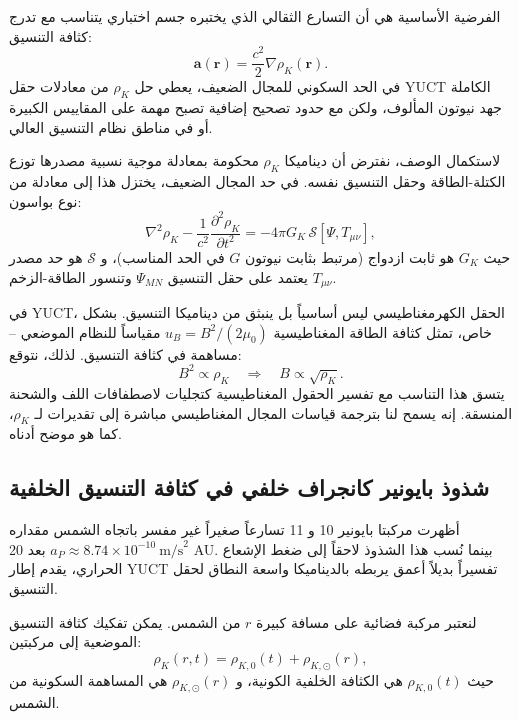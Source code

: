 \documentclass[11pt,a4paper]{article}
\theoremstyle{remark}
\begin{document}
	الفرضية الأساسية هي أن التسارع الثقالي الذي يختبره جسم اختباري يتناسب مع تدرج كثافة التنسيق:
	\begin{equation}
		\mathbf{a}(\mathbf{r}) = \frac{c^2}{2} \nabla \rho_K(\mathbf{r}).
		\label{eq:coord:grav_from_rho}
	\end{equation}
	في الحد السكوني للمجال الضعيف، يعطي حل \(\rho_K\) من معادلات حقل YUCT الكاملة جهد نيوتون المألوف، ولكن مع حدود تصحيح إضافية تصبح مهمة على المقاييس الكبيرة أو في مناطق نظام التنسيق العالي.
	
	لاستكمال الوصف، نفترض أن ديناميكا \(\rho_K\) محكومة بمعادلة موجية نسبية مصدرها توزع الكتلة-الطاقة وحقل التنسيق نفسه. في حد المجال الضعيف، يختزل هذا إلى معادلة من نوع بواسون:
	\begin{equation}
		\nabla^2 \rho_K - \frac{1}{c^2}\frac{\partial^2 \rho_K}{\partial t^2} = -4\pi G_K \, \mathcal{S}[\Psi, T_{\mu\nu}],
		\label{eq:coord:rho_K_eqn}
	\end{equation}
	حيث \(G_K\) هو ثابت ازدواج (مرتبط بثابت نيوتون \(G\) في الحد المناسب)، و \(\mathcal{S}\) هو حد مصدر يعتمد على حقل التنسيق \(\Psi_{MN}\) وتنسور الطاقة-الزخم \(T_{\mu\nu}\).
	
	في YUCT، الحقل الكهرمغناطيسي ليس أساسياً بل ينبثق من ديناميكا التنسيق. بشكل خاص، تمثل كثافة الطاقة المغناطيسية \(u_B = B^2/(2\mu_0)\) مقياساً للنظام الموضعي – مساهمة في كثافة التنسيق. لذلك، نتوقع:
	\begin{equation}
		B^2 \propto \rho_K \quad \Longrightarrow \quad B \propto \sqrt{\rho_K}.
		\label{eq:coord:B_rho}
	\end{equation}
	يتسق هذا التناسب مع تفسير الحقول المغناطيسية كتجليات لاصطفافات اللف والشحنة المنسقة. إنه يسمح لنا بترجمة قياسات المجال المغناطيسي مباشرة إلى تقديرات لـ \(\rho_K\)، كما هو موضح أدناه.
	
	\subsection{شذوذ بايونير كانجراف خلفي في كثافة التنسيق الخلفية}
	\label{subsec:coord:pioneer}
	
	أظهرت مركبتا بايونير 10 و 11 تسارعاً صغيراً غير مفسر باتجاه الشمس مقداره \(a_P \approx 8.74 \times 10^{-10}\ \text{m/s}^2\) بعد 20 AU. بينما نُسب هذا الشذوذ لاحقاً إلى ضغط الإشعاع الحراري، يقدم إطار YUCT تفسيراً بديلاً أعمق يربطه بالديناميكا واسعة النطاق لحقل التنسيق.
	
	لنعتبر مركبة فضائية على مسافة كبيرة \(r\) من الشمس. يمكن تفكيك كثافة التنسيق الموضعية إلى مركبتين:
	\begin{equation}
		\rho_K(r,t) = \rho_{K,0}(t) + \rho_{K,\odot}(r),
		\label{eq:coord:rho_decomp}
	\end{equation}
	حيث \(\rho_{K,0}(t)\) هي الكثافة الخلفية الكونية، و \(\rho_{K,\odot}(r)\) هي المساهمة السكونية من الشمس.
	
\end{document}
